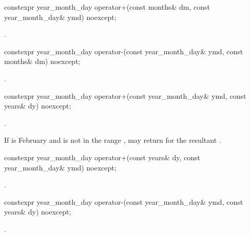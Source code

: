 %
\begin{itemdecl}
constexpr year_month_day operator+(const months& dm, const year_month_day& ymd) noexcept;
\end{itemdecl}

\begin{itemdescr}
\pnum
\returns
{}.
\end{itemdescr}

%
\begin{itemdecl}
constexpr year_month_day operator-(const year_month_day& ymd, const months& dm) noexcept;
\end{itemdecl}

\begin{itemdescr}
\pnum
\returns
{}.
\end{itemdescr}

%
\begin{itemdecl}
constexpr year_month_day operator+(const year_month_day& ymd, const years& dy) noexcept;
\end{itemdecl}

\begin{itemdescr}
\pnum
\returns
{}.

\pnum
\begin{note}
If  is February
and  is not in the range ,
 may return  for
the resultant .
\end{note}
\end{itemdescr}

%
\begin{itemdecl}
constexpr year_month_day operator+(const years& dy, const year_month_day& ymd) noexcept;
\end{itemdecl}

\begin{itemdescr}
\pnum
\returns
{}.
\end{itemdescr}

%
\begin{itemdecl}
constexpr year_month_day operator-(const year_month_day& ymd, const years& dy) noexcept;
\end{itemdecl}

\begin{itemdescr}
\pnum
\returns
{}.
\end{itemdescr}

